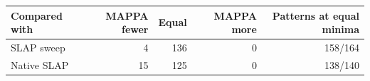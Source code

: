 \begin{tabular}{@{}lrrrr@{}}\toprule
Compared with & MAPPA fewer & Equal & MAPPA more & Patterns at equal minima\\\midrule
SLAP sweep & 4 & 136 & 0 & 158/164\\
Native SLAP & 15 & 125 & 0 & 138/140\\
\bottomrule\end{tabular}
